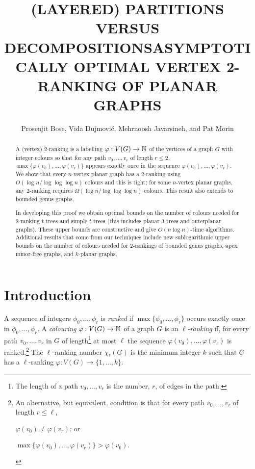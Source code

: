 \documentclass[kpfonts]{patmorin}
\title{\MakeUppercase{(Layered) Partitions versus Decompositions}}
\author{}
\title{\MakeUppercase{Asymptotically Optimal Vertex 2-Ranking of Planar Graphs}}
\author{Prosenjit Bose, Vida Dujmović, Mehrnoosh Javarsineh, and Pat Morin}
\theoremstyle{named}
\begin{document}
\begin{titlepage}
\maketitle

\begin{abstract}
  A (vertex) 2-ranking is a labelling $\varphi:V(G)\to\mathbb{N}$ of the vertices of a graph $G$ with integer colours so that for any path $v_0,\ldots,v_r$ of length $r\le 2$, $\max\{\varphi(v_0),\ldots,\varphi(v_r)\}$ appears exactly once in the sequence $\varphi(v_0),\ldots,\varphi(v_r)$.  We show that every $n$-vertex planar graph has a 2-ranking using $O(\log n/\log\log\log n)$ colours and this is tight; for some $n$-vertex planar graphs, any 2-ranking requires $\Omega(\log n/\log\log\log n)$ colours.  This result also extends to bounded genus graphs.

  In developing this proof we obtain optimal bounds on the number of colours needed for 2-ranking $t$-trees and simple $t$-trees (this includes planar 3-trees and outerplanar graphs).  These upper bounds are constructive and give $O(n\log n)$-time algorithms.  Additional results that come from our techniques include new sublogarithmic upper bounds on the number of colours needed for 2-rankings of bounded genus graphs, apex minor-free graphs, and $k$-planar graphs.
\end{abstract}
\end{titlepage}

\tableofcontents

\newpage
{}

\section{Introduction}

A sequence of integers $\phi_0,\ldots,\phi_r$ is \emph{ranked} if $\max\{\phi_0,\ldots,\phi_r\}$ occurs exactly once in $\phi_0,\ldots,\phi_r$. A \emph{colouring} $\varphi:V(G)\to \mathbb{N}$ of a graph $G$ is an \emph{$\ell$-ranking} if, for every path $v_0,\ldots,v_r$ in $G$ of length\footnote{The length of a path $v_0,\ldots,v_r$ is the number, $r$, of edges in the path.} at most $\ell$ the sequence $\varphi(v_0),\ldots,\varphi(v_r)$ is ranked.\footnote{An alternative, but equivalent, condition is that for every path $v_0,\ldots,v_r$ of length $r\le\ell$,
\begin{inparaenum}[(i)]
   \item $\varphi(v_0)\neq \varphi(v_r)$; or
   \item $\max\{\varphi(v_0),\ldots,\varphi(v_r)\} > \varphi(v_0)$.
\end{inparaenum}
}
The $\ell$-ranking number $\chi_\ell(G)$ is the minimum integer $k$ such that $G$ has a $\ell$-ranking $\varphi:V(G)\to \{1,\ldots,k\}$.
\end{document}
